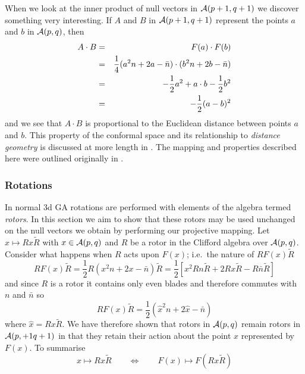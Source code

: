 When we look at the inner product of null vectors in
${\mathcal{A}}(p+1,q+1)$ we discover something very
interesting. If $A$ and $B$ in ${\mathcal{A}}(p+1,q+1)$
represent the points $a$ and $b$ in ${\mathcal{A}}(p,q)$, then
%
\begin{eqnarray} A\cdot B &  =  &  F(a)\cdot F(b) \nonumber \\
            &  =  &  \frac{1}{4}(a^2n + 2a - \bar{n})\cdot (b^2n + 2b -
            \bar{n})\nonumber \\
            & = &    -\frac{1}{2}a^2 + a\cdot b - \frac{1}{2}b^2 \nonumber \\
            &  =  &  -\frac{1}{2}(a-b)^2
            \label{distance}
\end{eqnarray}
%
and we see that $A\cdot B$ is proportional to the Euclidean
distance between points $a$ and $b$. This property of the
conformal space and its relationship to \emph{distance geometry}
\cite{distgeom} is discussed at more length in \cite{oldwine}. 
The mapping and properties described here were outlined
originally in \cite{HS84}.

\subsubsection{Rotations}


In normal 3d GA rotations are performed with elements of the algebra termed
\emph{rotors}. In this section we aim to show that these rotors may be used
unchanged on the null vectors we obtain by performing our projective mapping.
Let $x \mapsto Rx\tilde{R}$ with $x\in {\mathcal{A}}(p,q)$ and $R$ be a
rotor in the Clifford algebra over ${\mathcal{A}}(p,q)$. Consider
what happens when $R$ acts upon $F(x)$; i.e.\ the nature of
$RF(x)\tilde{R}$
%
\[ RF(x)\tilde{R} =\frac{1}{2} R(x^2n + 2x - \bar{n})\tilde{R} =\frac{1}{2}[ x^2Rn\tilde{R}
+ 2Rx\tilde{R} - R\bar{n}\tilde{R}] \]
%
and since $R$ is a rotor it contains only even blades and therefore 
commutes with
$n$ and $\bar{n}$  
so
%
\begin{equation} RF(x)\tilde{R} = \frac{1}{2}(\hat{x}^2n + 2\hat{x} - \bar{n})
	\end{equation}
%
where $\hat{x}=R x \tilde{R}$. We have therefore shown that rotors in
${\mathcal{A}}(p,q)$ remain rotors in ${\mathcal{A}}(p,+1q+1)$ in that they retain
their action about the point $x$ represented by $F(x)$. To summarise
%
\begin{equation} x \mapsto Rx\tilde{R} \qquad \Leftrightarrow \qquad F(x) \mapsto
F(Rx\tilde{R}) \end{equation}
%

